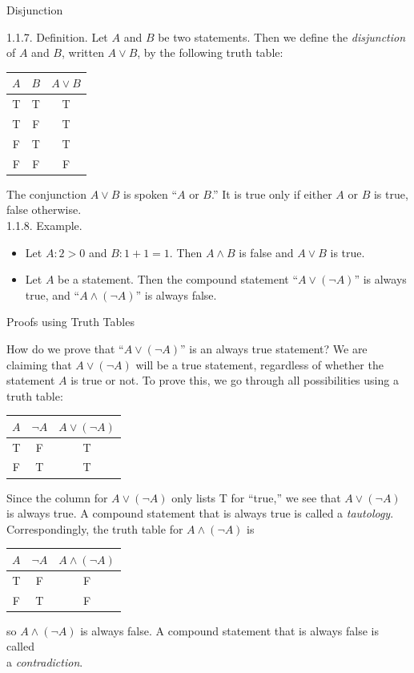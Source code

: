 \documentclass[smaller,hyperref={CJKbookmarks=true}]{beamer}
\begin{document}
\begin{frame}[t]{Disjunction}
\begin{spacing}{1.1}
\alert{1.1.7. Definition.} Let $A$ and $B$ be two statements. Then we define the \emph{disjunction} of $A$ and $B$, written $A\vee B$, by the following truth table:
\begin{center}
  \begin{tabular}{c|c|c}
    $A$ & $B$ & $A\vee B$ \\ \hline
    T & T & T \\
    T & F & T \\
    F & T & T \\
    F & F & F
  \end{tabular}
\end{center}
The conjunction $A\vee B$ is spoken ``$A$ or $B$.'' It is true only if either $A$ or $B$ is true, false otherwise.\\[5pt]
\alert{1.1.8. Example.}
\begin{itemize}
  \item Let $A\!:2>0$ and $B\!:1+1=1$. Then $A\wedge B$ is false and $A\vee B$ is true.
  \item Let $A$ be a statement. Then the compound statement ``$A\vee(\neg A)$'' is always true, and ``$A\wedge(\neg A)$'' is always false.
\end{itemize}
\end{spacing}
\end{frame}
\begin{frame}[t]{Proofs using Truth Tables}
\begin{spacing}{1.05}
\vspace*{-6pt}
How do we prove that ``$A\vee(\neg A)$'' is an always true statement? We are claiming that $A\vee(\neg A)$ will be a true statement, regardless of whether the statement $A$ is true or not. To prove this, we go through all possibilities using a truth table:
\begin{center}
\begin{tabular}{c|c|c}
  $A$ & $\neg A$ & $A\vee(\neg A)$ \\ \hline
  T & F & T \\
  F & T & T \\
\end{tabular}
\end{center}
Since the column for $A\vee(\neg A)$ only lists T for ``true,'' we see that $A\vee(\neg A)$ is always true. A compound statement that is always true is called a \emph{tautology}.\\[5pt]
Correspondingly, the truth table for $A\wedge(\neg A)$ is
\begin{center}
\begin{tabular}{c|c|c}
  $A$ & $\neg A$ & $A\wedge(\neg A)$ \\ \hline
  T & F & F \\
  F & T & F \\
\end{tabular}
\end{center}
so $A\wedge(\neg A)$ is always false. A compound statement that is always false is called\\ a \emph{contradiction}.
\end{spacing}
\end{frame}
\end{document}
